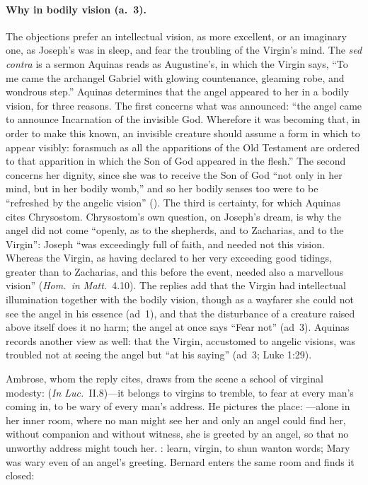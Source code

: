 \paragraph{Why in bodily vision (a.~3).} The objections prefer an
intellectual vision, as more excellent, or an imaginary one, as Joseph's
was in sleep, and fear the troubling of the Virgin's mind. The \emph{sed
contra} is a sermon Aquinas reads as Augustine's, in which the Virgin says,
``To me came the archangel Gabriel with glowing countenance, gleaming robe,
and wondrous step.'' Aquinas determines that the angel appeared to her in a
bodily vision, for three reasons. The first concerns what was announced:
``the angel came to announce Incarnation of the invisible God. Wherefore it
was becoming that, in order to make this known, an invisible creature should
assume a form in which to appear visibly: forasmuch as all the apparitions
of the Old Testament are ordered to that apparition in which the Son of God
appeared in the flesh.'' The second concerns her dignity, since she was to
receive the Son of God ``not only in her mind, but in her bodily womb,'' and
so her bodily senses too were to be ``refreshed by the angelic vision''
(). The third is certainty, for which
Aquinas cites Chrysostom. Chrysostom's own question, on Joseph's dream, is
why the angel did not come ``openly, as to the shepherds, and to Zacharias,
and to the Virgin'': Joseph ``was exceedingly full of faith, and needed not
this vision. Whereas the Virgin, as having declared to her very exceeding
good tidings, greater than to Zacharias, and this before the event, needed
also a marvellous vision'' (\emph{Hom.\ in Matt.}\ 4.10). The replies add
that the Virgin had intellectual illumination together with the bodily
vision, though as a wayfarer she could not see the angel in his essence
(ad~1), and that the disturbance of a creature raised above itself does it
no harm; the angel at once says ``Fear not'' (ad~3). Aquinas records
another view as well: that the Virgin, accustomed to angelic visions, was
troubled not at seeing the angel but ``at his saying'' (ad~3; Luke 1:29).

Ambrose, whom the reply cites, draws from the scene a school of virginal
modesty:  (\emph{In Luc.}\ II.8)---it belongs to virgins to
tremble, to fear at every man's coming in, to be wary of every man's
address. He pictures the place: ---alone in her
inner room, where no man might see her and only an angel could find her,
without companion and without witness, she is greeted by an angel, so that
no unworthy address might touch her. : learn, virgin, to
shun wanton words; Mary was wary even of an angel's greeting. Bernard
enters the same room and finds it closed:

